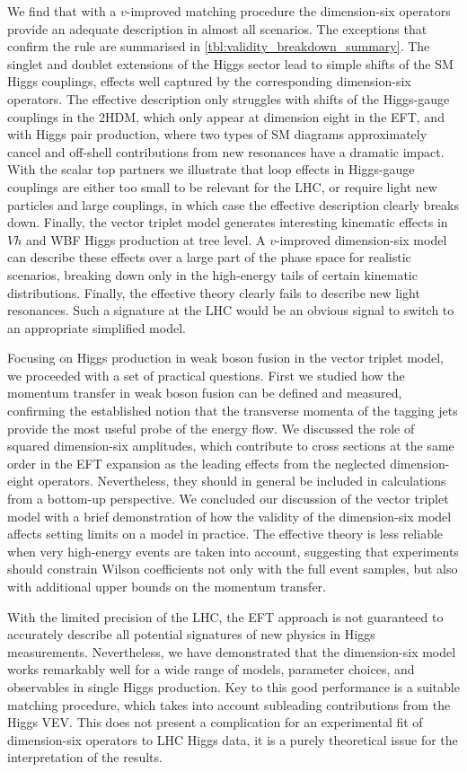 We find that with a $v$-improved matching procedure the dimension-six
operators provide an adequate description in almost all scenarios. The
exceptions that confirm the rule are summarised in
\autoref{tbl:validity_breakdown_summary}. The singlet and doublet
extensions of the Higgs sector lead to simple shifts of the SM Higgs
couplings, effects well captured by the corresponding dimension-six
operators. The effective description only struggles with shifts of the
Higgs-gauge couplings in the 2HDM, which only appear at dimension
eight in the EFT, and with Higgs pair production, where two types of
SM diagrams approximately cancel and off-shell contributions from new
resonances have a dramatic impact.  With the scalar top partners we
illustrate that loop effects in Higgs-gauge couplings are either too
small to be relevant for the LHC, or require light new particles and
large couplings, in which case the effective description clearly
breaks down. Finally, the vector triplet model generates interesting
kinematic effects in $Vh$ and WBF Higgs production at tree level. A
$v$-improved dimension-six model can describe these effects over a
large part of the phase space for realistic scenarios, breaking down
only in the high-energy tails of certain kinematic
distributions. Finally, the effective theory clearly fails to describe
new light resonances. Such a signature at the LHC would be an obvious
signal to switch to an appropriate simplified model.

Focusing on Higgs production in weak boson fusion in the vector
triplet model, we proceeded with a set of practical questions. First
we studied how the momentum transfer in weak boson fusion can be
defined and measured, confirming the established notion that the
transverse momenta of the tagging jets provide the most useful probe
of the energy flow. We discussed the role of squared dimension-six
amplitudes, which contribute to cross sections at the same order in
the EFT expansion as the leading effects from the neglected
dimension-eight operators. Nevertheless, they should in general be
included in calculations from a bottom-up perspective. We concluded
our discussion of the vector triplet model with a brief demonstration
of how the validity of the dimension-six model affects setting limits
on a model in practice. The effective theory is less reliable when
very high-energy events are taken into account, suggesting that
experiments should constrain Wilson coefficients not only with the
full event samples, but also with additional upper bounds on the
momentum transfer.

With the limited precision of the LHC, the EFT approach is not
guaranteed to accurately describe all potential signatures of new
physics in Higgs measurements. Nevertheless, we have demonstrated that
the dimension-six model works remarkably well for a wide range of
models, parameter choices, and observables in single Higgs
production. Key to this good performance is a suitable matching
procedure, which takes into account subleading contributions from the
Higgs VEV. This does not present a complication for an experimental
fit of dimension-six operators to LHC Higgs data, it is a purely
theoretical issue for the interpretation of the results.